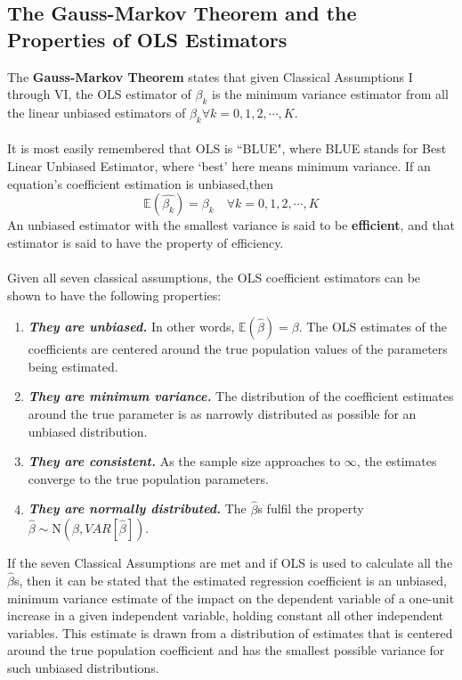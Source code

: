 \documentclass[11pt]{article}
\begin{document}
\subsection{The Gauss-Markov Theorem and the Properties of OLS Estimators}
The \textbf{Gauss-Markov Theorem} states that given Classical Assumptions I through VI, the OLS estimator of $\beta_k$ is the minimum variance estimator from all the linear unbiased estimators of $\beta_k \forall k=0, 1, 2, \cdots, K$. \\ \\
It is most easily remembered that OLS is ``BLUE", where BLUE stands for Best Linear Unbiased Estimator, where `best' here means minimum variance. If an equation's coefficient estimation is unbiased,then 
$$\mathbb{E}(\hat{\beta_k}) = \beta_k \quad \forall k=0, 1, 2, \cdots, K$$
An unbiased estimator with the smallest variance is said to be \textbf{efficient}, and that estimator is said to have the property of efficiency.\\ \\
Given all seven classical assumptions, the OLS coefficient estimators can be shown to have the following properties:
\begin{enumerate}
\item \textbf{\textit{They are unbiased.}} In other words, $\mathbb{E}(\hat{\beta}) = \beta$. The OLS estimates of the coefficients are centered around the true population values of the parameters being estimated.
\item \textbf{\textit{They are minimum variance.}} The distribution of the coefficient estimates around the true parameter is as narrowly distributed as possible for an unbiased distribution.
\item \textbf{\textit{They are consistent.}} As the sample size approaches to $\infty$, the estimates converge to the true population parameters.
\item \textbf{\textit{They are normally distributed.}} The $\hat{\beta}$s fulfil the property $\hat{\beta} \sim \text{N}(\beta, VAR[\hat{\beta}])$. 
\end{enumerate}
If the seven Classical Assumptions are met and if OLS is used to calculate all the $\hat{\beta}$s, then it can be stated that the estimated regression coefficient is an unbiased, minimum variance estimate of the impact on the dependent variable of a one-unit increase in a given independent variable, holding constant all other independent variables. This estimate is drawn from a distribution of estimates that is centered around the true population coefficient and has the smallest possible variance for such unbiased distributions.
\end{document}
